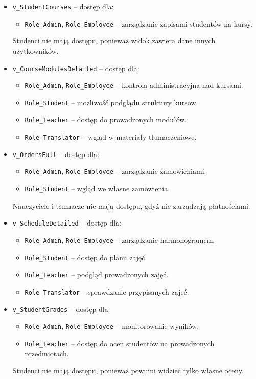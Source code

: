 \documentclass[12pt]{article}
\begin{document}
\begin{itemize}
    \item \texttt{v\_StudentCourses} -- dostęp dla:
        \begin{itemize}
            \item \texttt{Role\_Admin}, \texttt{Role\_Employee} -- zarządzanie zapisami studentów na kursy.
        \end{itemize}
        Studenci nie mają dostępu, ponieważ widok zawiera dane innych użytkowników.

    \item \texttt{v\_CourseModulesDetailed} -- dostęp dla:
        \begin{itemize}
            \item \texttt{Role\_Admin}, \texttt{Role\_Employee} -- kontrola administracyjna nad kursami.
            \item \texttt{Role\_Student} -- możliwość podglądu struktury kursów.
            \item \texttt{Role\_Teacher} -- dostęp do prowadzonych modułów.
            \item \texttt{Role\_Translator} -- wgląd w materiały tłumaczeniowe.
        \end{itemize}

    \item \texttt{v\_OrdersFull} -- dostęp dla:
        \begin{itemize}
            \item \texttt{Role\_Admin}, \texttt{Role\_Employee} -- zarządzanie zamówieniami.
            \item \texttt{Role\_Student} -- wgląd we własne zamówienia.
        \end{itemize}
        Nauczyciele i tłumacze nie mają dostępu, gdyż nie zarządzają płatnościami.

    \item \texttt{v\_ScheduleDetailed} -- dostęp dla:
        \begin{itemize}
            \item \texttt{Role\_Admin}, \texttt{Role\_Employee} -- zarządzanie harmonogramem.
            \item \texttt{Role\_Student} -- dostęp do planu zajęć.
            \item \texttt{Role\_Teacher} -- podgląd prowadzonych zajęć.
            \item \texttt{Role\_Translator} -- sprawdzanie przypisanych zajęć.
        \end{itemize}

    \item \texttt{v\_StudentGrades} -- dostęp dla:
        \begin{itemize}
            \item \texttt{Role\_Admin}, \texttt{Role\_Employee} -- monitorowanie wyników.
            \item \texttt{Role\_Teacher} -- dostęp do ocen studentów na prowadzonych przedmiotach.
        \end{itemize}
        Studenci nie mają dostępu, ponieważ powinni widzieć tylko własne oceny.
\end{itemize}
\end{document}
